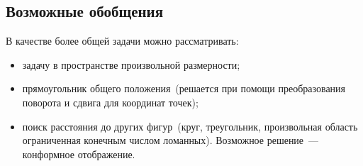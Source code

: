 \subsection{Возможные обобщения}
В качестве более общей задачи можно рассматривать:
\begin{itemize}
\item задачу в пространстве произвольной размерности;
\item прямоугольник общего положения~(решается при помощи преобразования поворота и сдвига для координат точек);
\item поиск расстояния до других фигур~(круг, треугольник, произвольная область ограниченная конечным числом ломанных). Возможное решение~--- конформное отображение.
\end{itemize}

